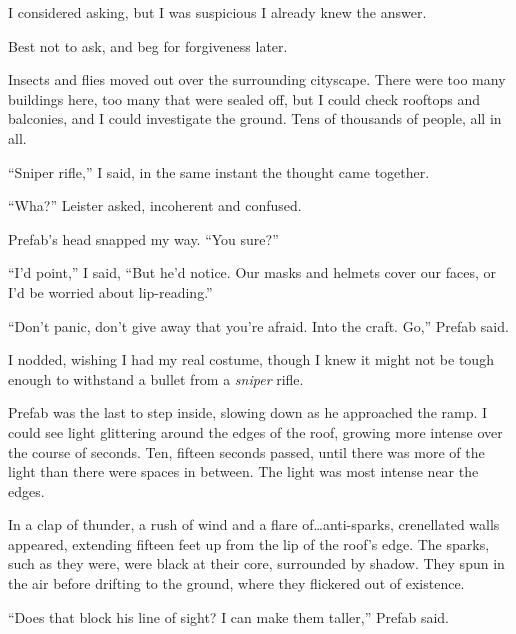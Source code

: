 I considered asking, but I was suspicious I already knew the answer.



Best not to ask, and beg for forgiveness later.



Insects and flies moved out over the surrounding cityscape.  There were too many buildings here, too many that were sealed off, but I could check rooftops and balconies, and I could investigate the ground.  Tens of thousands of people, all in all.



``Sniper rifle,'' I said, in the same instant the thought came together.



``Wha?'' Leister asked, incoherent and confused.



Prefab's head snapped my way.  ``You sure?''



``I'd point,'' I said, ``But he'd notice.  Our masks and helmets cover our faces, or I'd be worried about lip-reading.''



``Don't panic, don't give away that you're afraid.  Into the craft.  Go,'' Prefab said.



I nodded, wishing I had my real costume, though I knew it might not be tough enough to withstand a bullet from a \emph{sniper} rifle.



Prefab was the last to step inside, slowing down as he approached the ramp.  I could see light glittering around the edges of the roof, growing more intense over the course of seconds.  Ten, fifteen seconds passed, until there was more of the light than there were spaces in between.  The light was most intense near the edges.



In a clap of thunder, a rush of wind and a flare of\ldots anti-sparks, crenellated walls appeared, extending fifteen feet up from the lip of the roof's edge.  The sparks, such as they were, were black at their core, surrounded by shadow.  They spun in the air before drifting to the ground, where they flickered out of existence.



``Does that block his line of sight?  I can make them taller,'' Prefab said.




